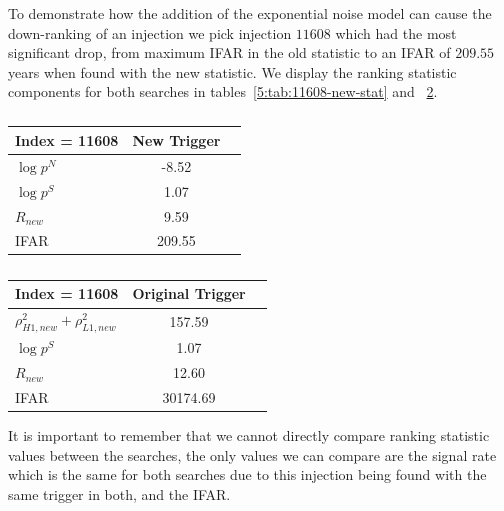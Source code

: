 To demonstrate how the addition of the exponential noise model can cause the down-ranking of an injection we pick injection $11608$ which had the most significant drop, from maximum IFAR in the old statistic to an IFAR of $209.55$ years when found with the new statistic. We display the ranking statistic components for both searches in tables~\ref{5:tab:11608-new-stat} and ~\ref{5:tab:11608-old-stat}.
%
\begin{table}[ht]
    \centering
    \setlength{\tabcolsep}{4pt}
    \begin{minipage}{0.48\textwidth}
        \centering
        \begin{adjustbox}{minipage=\linewidth-0cm, margin=0.5cm 0cm 0cm 0cm}
        \begin{tabular}{lcc}
            \toprule
            \textbf{Index = 11608} & \textbf{New Trigger} \\
            \midrule
            $\log p^{N}$  & -8.52 \\
            $\log p^{S}$ & 1.07 \\
            $R_{new}$ & 9.59 \\
            IFAR & 209.55 \\
            \bottomrule
        \end{tabular}
        \end{adjustbox}
        \caption{}
        \label{5:tab:11608-new-stat}
    \end{minipage}
    \hfill
    \begin{minipage}{0.48\textwidth}
        \centering
        \begin{tabular}{lcc}
            \toprule
            \textbf{Index = 11608} & \textbf{Original Trigger}\\
            \midrule
            $\rho_{H1,new}^2 + \rho_{L1,new}^2$   & 157.59 \\
            $\log p^{S}$ & 1.07 \\
            $R_{new}$ & 12.60 \\
            IFAR & 30174.69 \\
            \bottomrule
        \end{tabular}
        \caption{}
        \label{5:tab:11608-old-stat}
    \end{minipage}
\end{table}
%
It is important to remember that we cannot directly compare ranking statistic values between the searches, the only values we can compare are the signal rate which is the same for both searches due to this injection being found with the same trigger in both, and the IFAR.

